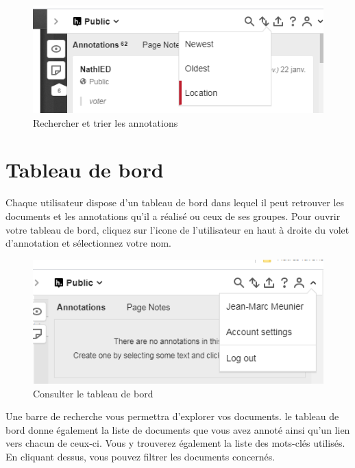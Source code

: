\documentclass[
]{book}
\begin{document}
\begin{figure}
\centering
\includegraphics{img/sort.png}
\caption{Rechercher et trier les annotations}
\end{figure}

\hypertarget{tableau-de-bord}{%
\section{Tableau de bord}\label{tableau-de-bord}}

Chaque utilisateur dispose d'un tableau de bord dans lequel il peut retrouver les documents et les annotations qu'il a réalisé ou ceux de ses groupes. Pour ouvrir votre tableau de bord, cliquez sur l'icone de l'utilisateur en haut à droite du volet d'annotation et sélectionnez votre nom.

\begin{figure}
\centering
\includegraphics{img/login.png}
\caption{Consulter le tableau de bord}
\end{figure}

Une barre de recherche vous permettra d'explorer vos documents. le tableau de bord donne également la liste de documents que vous avez annoté ainsi qu'un lien vers chacun de ceux-ci. Vous y trouverez également la liste des mots-clés utilisés. En cliquant dessus, vous pouvez filtrer les documents concernés.
\end{document}
